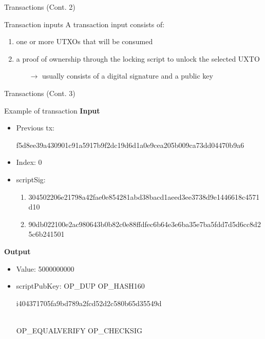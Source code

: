 \documentclass{beamer}
\begin{document}
  \begin{frame}{Transactions (Cont. 2)}
    \begin{block}{Transaction inputs}
      A transaction input consists of: 
      \begin{enumerate}
        \item one or more UTXOs that will be consumed 
        \item a proof of ownership through the locking script to unlock the selected UXTO 
        \begin{itemize}
          \item[$\rightarrow$] usually consists of a digital signature and a public key
        \end{itemize}
      \end{enumerate}
    \end{block}
  \end{frame}
  
  
  
  
  \begin{frame}{Transactions (Cont. 3)}
    \begin{block}{Example of transaction}
        \textbf{Input}\\
        \begin{itemize}
            \item Previous tx: \begin{tiny}f5d8ee39a430901c91a5917b9f2dc19d6d1a0e9cea205b009ca73dd04470b9a6\end{tiny}
            \item Index: 0
            \item scriptSig: 
            \begin{enumerate}
                \item \begin{tiny}304502206e21798a42fae0e854281abd38bacd1aeed3ee3738d9e1446618c4571d10\end{tiny}
                \item \begin{tiny}90db022100e2ac980643b0b82c0e88ffdfec6b64e3e6ba35e7ba5fdd7d5d6cc8d25c6b241501\end{tiny}
            \end{enumerate}
        \end{itemize}

        \textbf{Output}\\
        \begin{itemize}
            \item Value: 5000000000
            \item scriptPubKey: OP\_DUP OP\_HASH160 \begin{tiny}i404371705fa9bd789a2fcd52d2c580b65d35549d\end{tiny}\\ OP\_EQUALVERIFY OP\_CHECKSIG
        \end{itemize}
    \end{block}
  \end{frame}
  
\end{document}
